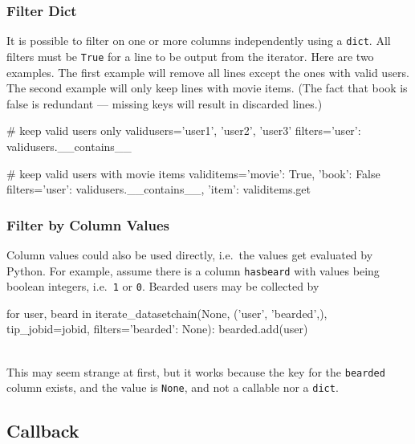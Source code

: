 \subsubsection*{Filter Dict}

It is possible to filter on one or more columns independently using a
\texttt{dict}.  All filters must be \texttt{True} for a line to be
output from the iterator.  Here are two examples.  The first example
will remove all lines except the ones with valid users.  The second
example will only keep lines with movie items.  (The fact that book is
false is redundant --- missing keys will result in discarded lines.)

\begin{python}
# keep valid users only
validusers={'user1', 'user2', 'user3'}
filters={'user': validusers.__contains__}

# keep valid users with movie items
validitems={'movie': True, 'book': False}
filters={'user': validusers.__contains__, 'item': validitems.get}
\end{python}




\subsubsection*{Filter by Column Values}


Column values could also be used directly, i.e.\ the values get
evaluated by Python.  For example, assume there is a column
\texttt{hasbeard} with values being boolean integers, i.e.\ \texttt{1}
or \texttt{0}.  Bearded users may be collected by
\\
\begin{python}
for user, beard in iterate_datasetchain(None, ('user', 'bearded',), tip_jobid=jobid,
                                       filters={'bearded': None}):
    bearded.add(user)
\end{python}
\\
This may seem strange at first, but it works because the key
for the \texttt{bearded} column exists, and the value is
\texttt{None}, and not a callable nor a \texttt{dict}.





    


\subsection{Callback}
\label{sec:callback}

